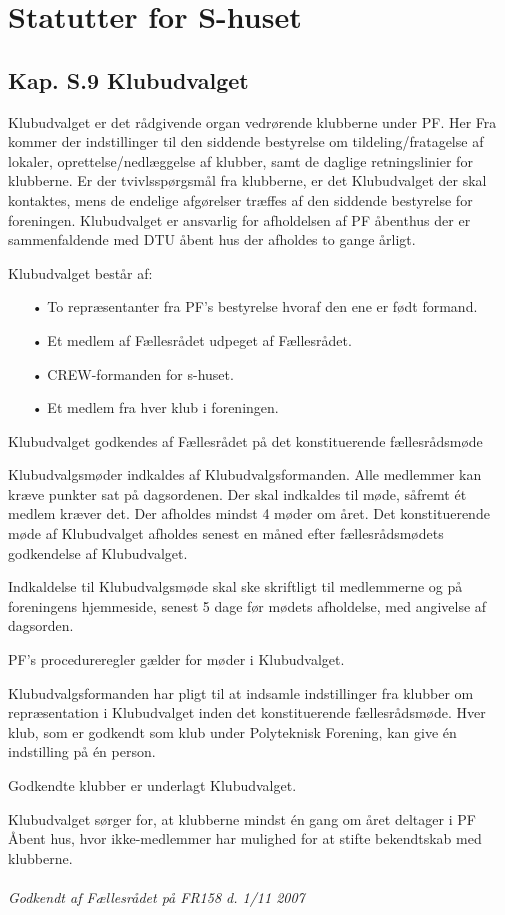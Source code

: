 \section*{Statutter for S-huset}
\subsection{Kap. S.9 Klubudvalget}
\label{s:klubudvalget}
\item Klubudvalget er det rådgivende organ vedrørende klubberne under PF. Her Fra kommer der indstillinger til den siddende bestyrelse om tildeling/fratagelse af lokaler, oprettelse/nedlæggelse af klubber, samt de daglige retningslinier for klubberne. Er der tvivlsspørgsmål fra klubberne, er det Klubudvalget der skal kontaktes, mens de endelige afgørelser træffes af den siddende bestyrelse for foreningen. Klubudvalget er ansvarlig for afholdelsen af PF åbenthus der er sammenfaldende med DTU åbent hus der afholdes to gange årligt.
\item Klubudvalget består af:
	\begin{enumerate}
	\item[•] To repræsentanter fra PF’s bestyrelse hvoraf den ene er født formand.
	\item[•] Et medlem af Fællesrådet udpeget af Fællesrådet.
	\item[•] CREW-formanden for s-huset.
	\item[•] Et medlem fra hver klub i foreningen.
	\end{enumerate}
\item Klubudvalget godkendes af Fællesrådet på det konstituerende fællesrådsmøde
\item Klubudvalgsmøder indkaldes af Klubudvalgsformanden. Alle medlemmer kan kræve punkter sat på dagsordenen. Der skal indkaldes til møde, såfremt ét medlem kræver det. Der afholdes mindst 4 møder om året. Det konstituerende møde af Klubudvalget afholdes senest en måned efter fællesrådsmødets godkendelse af Klubudvalget.
\item Indkaldelse til Klubudvalgsmøde skal ske skriftligt til medlemmerne og på foreningens hjemmeside, senest 5 dage før mødets afholdelse, med angivelse af dagsorden.
\item PF's procedureregler gælder for møder i Klubudvalget.
\item Klubudvalgsformanden har pligt til at indsamle indstillinger fra klubber om repræsentation i Klubudvalget inden det konstituerende fællesrådsmøde. Hver klub, som er godkendt som klub under Polyteknisk Forening, kan give én indstilling på én person.
\item Godkendte klubber er underlagt Klubudvalget.
\item Klubudvalget sørger for, at klubberne mindst én gang om året deltager i PF Åbent hus, hvor ikke-medlemmer har mulighed for at stifte bekendtskab med klubberne.\\
\\
\textit{Godkendt af Fællesrådet på FR158 d. 1/11 2007}
